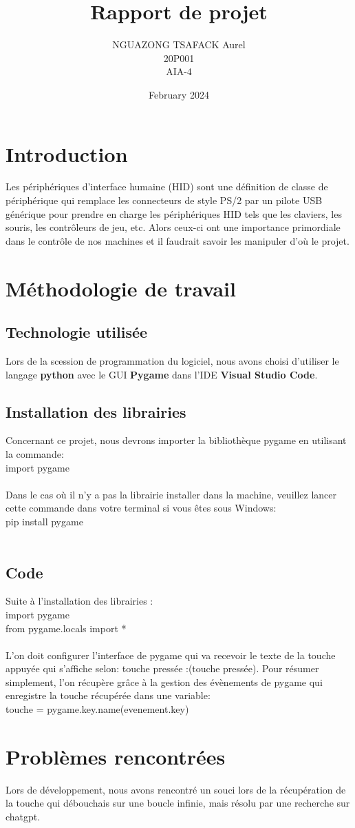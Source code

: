 \documentclass{article}
\title{Rapport de projet}
\author{NGUAZONG TSAFACK Aurel\\20P001\\AIA-4}
\date{February 2024}
\begin{document}
\maketitle
\section{Introduction}

Les périphériques d’interface humaine (HID) sont une définition de classe de périphérique qui remplace les connecteurs de style PS/2 par un pilote USB générique pour prendre en charge les périphériques HID tels que les claviers, les souris, les contrôleurs de jeu, etc. Alors ceux-ci ont une importance primordiale dans le contrôle de nos machines et il faudrait savoir les manipuler d'où le projet.

\section{Méthodologie de travail}
\subsection{Technologie utilisée}
Lors de la scession de programmation du logiciel, nous avons choisi d'utiliser le langage \textbf{python} avec le GUI \textbf{Pygame} dans l'IDE \textbf{Visual Studio Code}.
\subsection{Installation des librairies}
Concernant ce projet, nous devrons importer la bibliothèque pygame en utilisant la commande:\\
import pygame\\
\\
Dans le cas où il n'y a pas la librairie installer dans la machine, veuillez lancer cette commande dans votre terminal si vous êtes sous Windows:\\
pip install pygame\\
\\
\subsection{Code}
Suite à l'installation des librairies :\\
import pygame\\
from pygame.locals import *\\
\\

L'on doit configurer l'interface de pygame qui va recevoir le texte de la touche appuyée qui s'affiche selon: touche pressée :(touche pressée). Pour résumer simplement, l'on récupère grâce à la gestion des évènements de pygame qui enregistre la touche récupérée dans une variable:\\
touche = pygame.key.name(evenement.key)
\section{Problèmes rencontrées}
Lors de développement, nous avons rencontré un souci lors de la récupération de la touche qui débouchais sur une boucle infinie, mais résolu par une recherche sur chatgpt.
\end{document}
